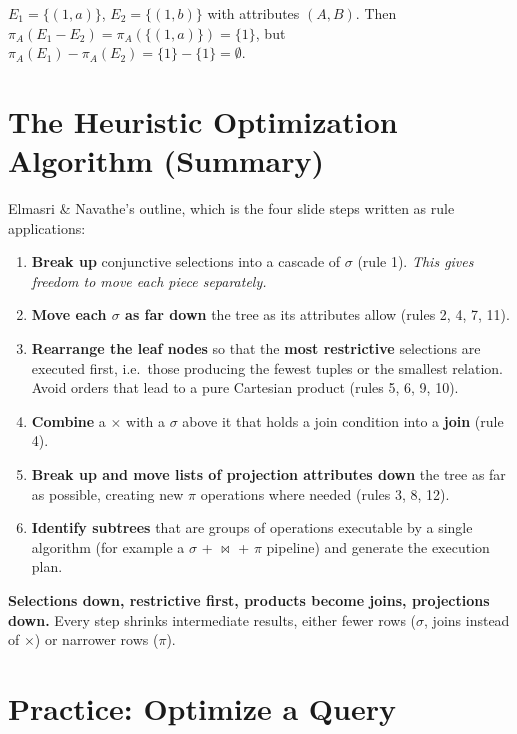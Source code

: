 \documentclass[10pt,a4paper]{article}
\begin{document}
\begin{exbox}
$E_1 = \{(1,a)\}$, $E_2 = \{(1,b)\}$ with attributes $(A,B)$. Then $\pi_A(E_1 - E_2) = \pi_A(\{(1,a)\}) = \{1\}$, but $\pi_A(E_1) - \pi_A(E_2) = \{1\} - \{1\} = \emptyset$.
\end{exbox}

\section{The Heuristic Optimization Algorithm (Summary)}

Elmasri \& Navathe's outline, which is the four slide steps written as rule applications:
\begin{enumerate}
  \item \textbf{Break up} conjunctive selections into a cascade of $\sigma$ (rule 1). \emph{This gives freedom to move each piece separately.}
  \item \textbf{Move each $\sigma$ as far down} the tree as its attributes allow (rules 2, 4, 7, 11).
  \item \textbf{Rearrange the leaf nodes} so that the \textbf{most restrictive} selections are executed first, i.e.\ those producing the fewest tuples or the smallest relation. Avoid orders that lead to a pure Cartesian product (rules 5, 6, 9, 10).
  \item \textbf{Combine} a $\times$ with a $\sigma$ above it that holds a join condition into a \textbf{join} (rule 4).
  \item \textbf{Break up and move lists of projection attributes down} the tree as far as possible, creating new $\pi$ operations where needed (rules 3, 8, 12).
  \item \textbf{Identify subtrees} that are groups of operations executable by a single algorithm (for example a $\sigma$ + $\bowtie$ + $\pi$ pipeline) and generate the execution plan.
\end{enumerate}

\begin{keybox}
\textbf{Selections down, restrictive first, products become joins, projections down.} Every step shrinks intermediate results, either fewer rows ($\sigma$, joins instead of $\times$) or narrower rows ($\pi$).
\end{keybox}

\section{Practice: Optimize a Query}
\end{document}
